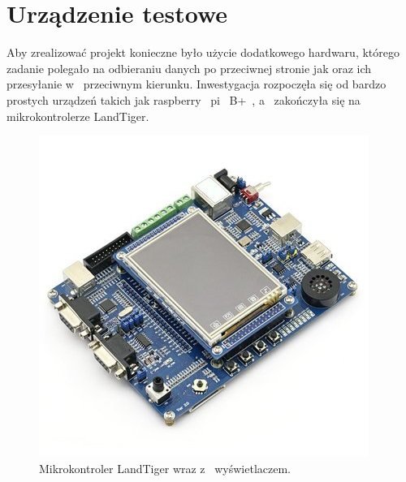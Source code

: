 \documentclass{BscUS}
\newcommand\blankpage{%
    \null
    \thispagestyle{empty}%
    \newpage}
\begin{document}
\chapter{Urządzenie testowe}
\label{microcontrollerChapter}
Aby zrealizować projekt konieczne było użycie dodatkowego hardwaru, którego zadanie polegało na odbieraniu danych po przeciwnej stronie jak oraz ich przesyłanie w~ przeciwnym kierunku. Inwestygacja rozpoczęła się od bardzo prostych urządzeń takich jak raspberry~ pi~ B+~, a~ zakończyła się na mikrokontrolerze LandTiger.

\begin{figure}[h]
\centering
\includegraphics{./img/landTiger}
\caption{Mikrokontroler LandTiger wraz z~ wyświetlaczem. \cite{landtigerDesc}}
\end{figure}
\end{document}
